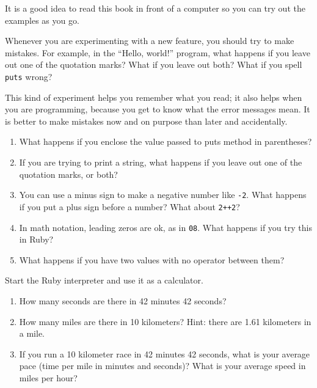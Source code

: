 \documentclass[10pt]{book}
\begin{document}
\begin{exercise}

It is a good idea to read this book in front of a computer so you can
try out the examples as you go.

Whenever you are experimenting with a new feature, you should try
to make mistakes.  For example, in the ``Hello, world!'' program,
what happens if you leave out one of the quotation marks?  What
if you leave out both?  What if you spell {\tt puts} wrong?

This kind of experiment helps you remember what you read; it also
helps when you are programming, because you get to know what the error
messages mean.  It is better to make mistakes now and on purpose than
later and accidentally.

\begin{enumerate}

\item What happens if you enclose the value passed to puts method
in parentheses?

\item If you are trying to print a string, what happens if you
leave out one of the quotation marks, or both?

\item You can use a minus sign to make a negative number like
{\tt -2}.  What happens if you put a plus sign before a number?
What about {\tt 2++2}?

\item In math notation, leading zeros are ok, as in {\tt 08}.
What happens if you try this in Ruby?

\item What happens if you have two values with no operator
between them?

\end{enumerate}

\end{exercise}



\begin{exercise}

Start the Ruby interpreter and use it as a calculator.

\begin{enumerate}

\item How many seconds are there in 42 minutes 42 seconds?

\item How many miles are there in 10 kilometers?  Hint: there are 1.61
  kilometers in a mile.

\item If you run a 10 kilometer race in 42 minutes 42 seconds, what is
  your average pace (time per mile in minutes and seconds)?  What is
  your average speed in miles per hour?


\end{enumerate}

\end{exercise}
\end{document}
